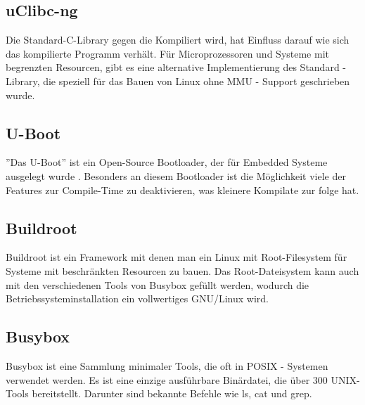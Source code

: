 
\subsection{uClibc-ng}
Die Standard-C-Library gegen die Kompiliert wird, hat Einfluss darauf wie sich das
kompilierte Programm verhält. Für Microprozessoren und Systeme mit begrenzten Resourcen,
gibt es eine alternative Implementierung des Standard - Library, die speziell für das
Bauen von Linux ohne MMU - Support geschrieben wurde.

\subsection{U-Boot}
''Das U-Boot'' ist ein Open-Source Bootloader, der für Embedded Systeme ausgelegt
wurde \cite{uBootSourceTree}. Besonders an diesem Bootloader ist die Möglichkeit viele
der Features zur Compile-Time zu deaktivieren, was kleinere Kompilate zur folge hat.

\subsection{Buildroot}
Buildroot ist ein Framework mit denen man ein Linux mit Root-Filesystem für
Systeme mit beschränkten Resourcen zu bauen. Das Root-Dateisystem kann auch mit
den verschiedenen Tools von Busybox gefüllt werden, wodurch die Betriebssysteminstallation
ein vollwertiges GNU/Linux wird.

\subsection{Busybox}
Busybox ist eine Sammlung minimaler Tools, die oft in POSIX - Systemen verwendet werden.
Es ist eine einzige ausführbare Binärdatei, die über 300 UNIX-Tools bereitstellt.
Darunter sind bekannte Befehle wie ls, cat und grep.

